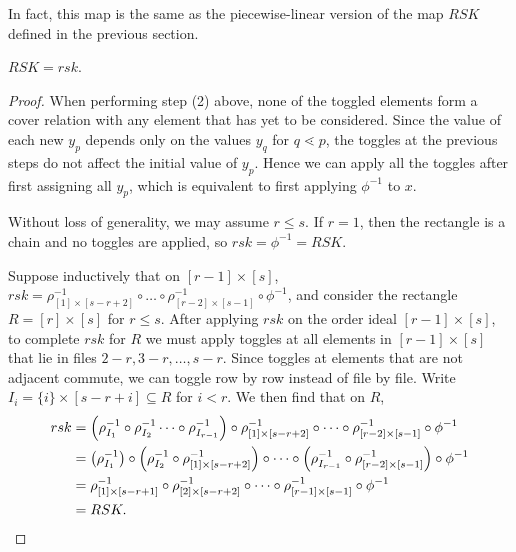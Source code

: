 \documentclass[ALCO,Unicode,published]{cedram}
\numberwithin{equation}{section}
\begin{document}
In fact, this map is the same as the piecewise-linear version of the map $RSK$ defined in the previous section.

\begin{Prop}
$RSK=rsk$.
\end{Prop}

\begin{proof}
When performing step (2) above, none of the toggled elements form a cover relation with any element that has yet to be considered. Since the value of each new $y_p$ depends only on the values $y_q$ for $q \lessdot p$, the toggles at the previous steps do not affect the initial value of $y_p$. Hence we can apply all the toggles after first assigning all $y_p$, which is equivalent to first applying $\phi^{-1}$ to $x$.

Without loss of generality, we may assume $r \leq s$. If $r = 1$, then the rectangle is a chain and no toggles are applied, so $rsk = \phi^{-1} = RSK$.

Suppose inductively that on $[r-1]\times[s]$, $rsk = \rho_{[1] \times [s-r+2]}^{-1} \circ \dots \circ \rho_{[r-2]\times[s-1]}^{-1} \circ \phi^{-1}$, and consider the rectangle $R=[r] \times [s]$ for $r \leq s$. After applying $rsk$ on the order ideal $[r-1] \times [s]$, to complete $rsk$ for $R$ we must apply toggles at all elements in $[r-1]\times[s]$ that lie in files $2-r, 3-r,\dots, s-r$. Since toggles at elements that are not adjacent commute, we can toggle row by row instead of file by file. Write $I_i = \{i\} \times [s-r+i] \subseteq R$ for $i < r$. We then find that on $R$,
\begin{align*}
    rsk &= \left( \rho_{I_1}^{-1} \circ \rho_{I_2}^{-1} \dots \circ \rho^{-1}_{I_{r-1}}  \right) \circ \rho_{[1] \times[s-r+2]}^{-1} \circ \dots \circ \rho_{[r-2]\times[s-1]}^{-1} \circ \phi^{-1} \\
    &= \left( \rho_{I_1}^{-1} \right) \circ \left( \rho_{I_2}^{-1} \circ \rho_{[1]\times[s-r+2]}^{-1} \right) \circ \dots \circ \left( \rho_{I_{r-1}}^{-1} \circ \rho_{[r-2]\times[s-1]}^{-1} \right) \circ \phi^{-1} \\
    &= \rho_{[1]\times[s-r+1]}^{-1} \circ \rho_{[2]\times[s-r+2]}^{-1} \circ \dots \circ \rho_{[r-1]\times[s-1]}^{-1} \circ \phi^{-1}\\
    &= RSK.\qedhere
\end{align*}
\end{proof}
\end{document}
